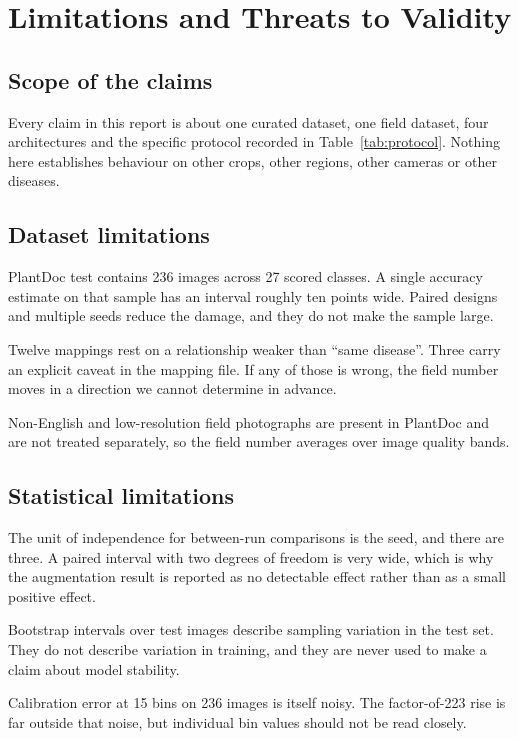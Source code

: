 
\chapter{Limitations and Threats to Validity}
\label{ch:limitations}

\section{Scope of the claims}

Every claim in this report is about one curated dataset, one field dataset, four
architectures and the specific protocol recorded in Table~\ref{tab:protocol}. Nothing
here establishes behaviour on other crops, other regions, other cameras or other
diseases.

\section{Dataset limitations}

PlantDoc test contains 236 images across 27 scored classes. A single accuracy
estimate on that sample has an interval roughly ten points wide. Paired designs and
multiple seeds reduce the damage, and they do not make the sample large.

Twelve mappings rest on a relationship weaker than ``same disease''. Three carry an
explicit caveat in the mapping file. If any of those is wrong, the field number moves
in a direction we cannot determine in advance.

Non-English and low-resolution field photographs are present in PlantDoc and are not
treated separately, so the field number averages over image quality bands.

\section{Statistical limitations}

The unit of independence for between-run comparisons is the seed, and there are
three. A paired interval with two degrees of freedom is very wide, which is why the
augmentation result is reported as no detectable effect rather than as a small
positive effect.

Bootstrap intervals over test images describe sampling variation in the test set.
They do not describe variation in training, and they are never used to make a claim
about model stability.

Calibration error at 15 bins on 236 images is itself noisy. The factor-of-223 rise
is far outside that noise, but individual bin values should not be read closely.

